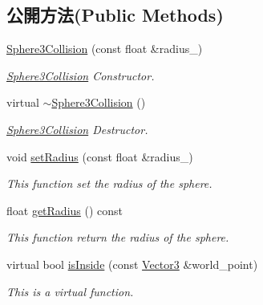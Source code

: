 \subsection*{公開方法(Public Methods)}
\begin{DoxyCompactItemize}
\item 
\hyperlink{class_i_dream_sky_1_1_sphere3_collision_a9da6a13091c103cb520e9c10c0fc1360}{Sphere3\+Collision} (const float \&radius\+\_)
\begin{DoxyCompactList}\small\item\em \hyperlink{class_i_dream_sky_1_1_sphere3_collision}{Sphere3\+Collision} Constructor. \end{DoxyCompactList}\item 
virtual \hyperlink{class_i_dream_sky_1_1_sphere3_collision_a274417dc6054f6c9509fb8efeba88cdc}{$\sim$\+Sphere3\+Collision} ()
\begin{DoxyCompactList}\small\item\em \hyperlink{class_i_dream_sky_1_1_sphere3_collision}{Sphere3\+Collision} Destructor. \end{DoxyCompactList}\item 
void \hyperlink{class_i_dream_sky_1_1_sphere3_collision_abd9f5a829661c4d4aac40da32bb95cf2}{set\+Radius} (const float \&radius\+\_\+)
\begin{DoxyCompactList}\small\item\em This function set the radius of the sphere. \end{DoxyCompactList}\item 
float \hyperlink{class_i_dream_sky_1_1_sphere3_collision_a92f0a4804bb7cd7d0d7a343e69c6d11d}{get\+Radius} () const 
\begin{DoxyCompactList}\small\item\em This function return the radius of the sphere. \end{DoxyCompactList}\item 
virtual bool \hyperlink{class_i_dream_sky_1_1_sphere3_collision_a54686b42bb5841ad0ad882f748b7dfad}{is\+Inside} (const \hyperlink{class_i_dream_sky_1_1_vector3}{Vector3} \&world\+\_\+point)
\begin{DoxyCompactList}\small\item\em This is a virtual function. \end{DoxyCompactList}\end{DoxyCompactItemize}
